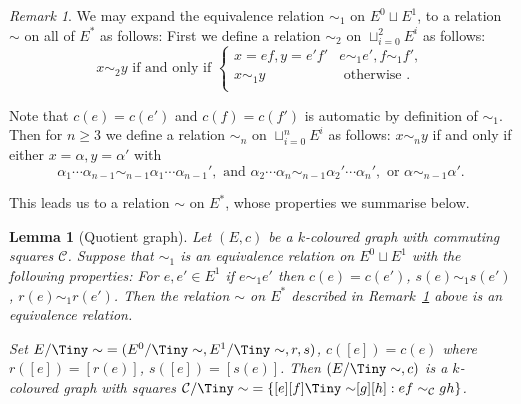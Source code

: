 \documentclass[12pt]{amsart}
\newtheorem{lem}[thm]{Lemma}
\theoremstyle{definition}
\theoremstyle{remark}
\newtheorem{rmk}[thm]{Remark}
\numberwithin{equation}{section}
\newcommand{\Cc}{\mathcal{C}}
\begin{document}
\begin{rmk} \label{rmk:simdef}
We may expand the equivalence relation $\sim_1$ on $E^0 \sqcup E^1$, to a relation $\sim$ on all of $E^*$ as follows:  First we define a relation $\sim_2$ on $\sqcup_{i=0}^2 E^i$ as follows: 
\begin{equation} \label{eq:nested1}
x \sim_2  y \text{ if and only if } \begin{cases} x=ef, y=e'f' & e \sim_1 e', f \sim_1 f', \\
x \sim_1 y & \text{ otherwise }. \\
\end{cases}
\end{equation}

\noindent
Note that $c(e)=c(e')$ and $c(f)=c(f')$ is automatic by definition of $\sim_1$. Then for $n \ge 3$ we define a relation $\sim_n$ on $\sqcup_{i=0}^n E^i$ as follows: $x \sim_n  y$ if and only if either $x=\alpha ,y=\alpha'$ with 
\begin{equation} \label{eq:nested2}
\alpha_1\cdots \alpha_{n-1} \sim_{n-1} \alpha_1 \cdots \alpha_{n-1}',  \text{ and } \alpha_2 \cdots \alpha_n \sim_{n-1} \alpha_2' \cdots   \alpha_n', \text { or } \alpha \sim_{n-1} \alpha'  .
\end{equation}

\noindent
This leads us to a relation $\sim$ on $E^*$, whose properties we summarise below.
\end{rmk}

\begin{lem}[Quotient graph] \label{lem:quotient k-colouredgraph}
Let $(E,c)$ be a $k$-coloured graph with commuting squares $\Cc$.  
Suppose that $\sim_1$ is an equivalence relation on $E^0 \sqcup E^1$
with the following properties: For $e,e' \in E^1$ if $e \sim_1 e'$ then $c(e) = c(e')$, $s(e) \sim_1 s(e')$, $r(e) \sim_1 r(e')$. Then the relation $\sim$ on $E^*$ described in Remark~\ref{rmk:simdef} above is an equivalence relation.

Set $E/{\Tiny\sim}  = (E^0/{\Tiny\sim},E^1/{\Tiny\sim},r,s)$, $c([e])=c(e)$ where $r([e])=[r(e)]$, $s([e])=[s(e)]$. Then $( E/{\Tiny\sim} , c )$ is a $k$-coloured graph with squares $\Cc / {\Tiny\sim}= \{ [e][f] {\Tiny\sim} [g][h] : ef \sim_\Cc gh \}$.
\end{lem}
\end{document}
